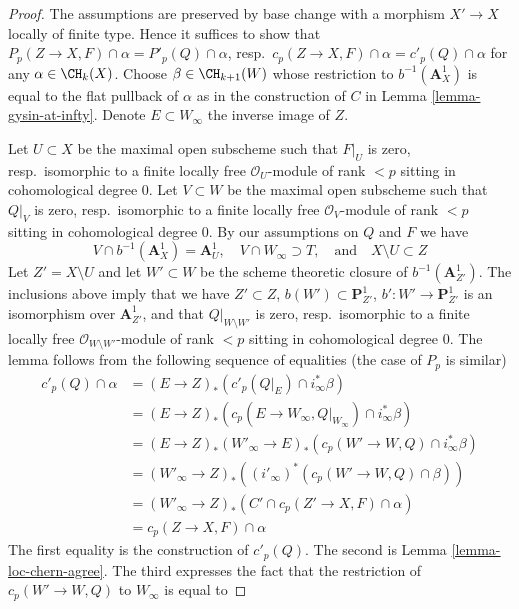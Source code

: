 \begin{proof}
The assumptions are preserved by base change with a morphism
$X' \to X$ locally of finite type. Hence it suffices to show that
$P_p(Z \to X, F) \cap \alpha = P'_p(Q) \cap \alpha$,
resp.\ $c_p(Z \to X, F) \cap \alpha = c'_p(Q) \cap \alpha$
for any $\alpha \in \CH_k(X)$. Choose $\beta \in \CH_{k + 1}(W)$
whose restriction to $b^{-1}(\mathbf{A}^1_X)$ is equal to
the flat pullback of $\alpha$ as in the construction of
$C$ in Lemma \ref{lemma-gysin-at-infty}.
Denote $E \subset W_\infty$ the inverse image of $Z$.

\medskip\noindent
Let $U \subset X$ be the maximal open subscheme such that $F|_U$ is
zero, resp.\ isomorphic to a finite locally free $\mathcal{O}_U$-module
of rank $< p$ sitting in cohomological degree $0$. Let $V \subset W$ be
the maximal open subscheme such that $Q|_V$ is zero, resp.\ isomorphic
to a finite locally free $\mathcal{O}_V$-module of rank $< p$ sitting in
cohomological degree $0$. By our assumptions on $Q$ and $F$ we have
$$
V \cap b^{-1}(\mathbf{A}^1_X) = \mathbf{A}^1_U,\quad
V \cap W_\infty \supset T,
\quad\text{and}\quad
X \setminus U \subset Z
$$
Let $Z' = X \setminus U$ and let $W' \subset W$ be the scheme
theoretic closure of $b^{-1}(\mathbf{A}^1_{Z'})$. The inclusions
above imply that we have $Z' \subset Z$, $b(W') \subset \mathbf{P}^1_{Z'}$,
$b' : W' \to \mathbf{P}^1_{Z'}$ is an isomorphism over $\mathbf{A}^1_{Z'}$,
and that $Q|_{W \setminus W'}$ is zero, resp.\ isomorphic to a finite
locally free $\mathcal{O}_{W \setminus W'}$-module of rank $< p$
sitting in cohomological degree $0$. The lemma follows from
the following sequence of equalities (the case of $P_p$ is similar)
\begin{align*}
c'_p(Q) \cap \alpha
& =
(E \to Z)_*(c'_p(Q|_E) \cap i_\infty^*\beta) \\
& =
(E \to Z)_*(c_p(E \to W_\infty, Q|_{W_\infty}) \cap i_\infty^*\beta) \\
& =
(E \to Z)_*(W'_\infty \to E)_*(c_p(W' \to W, Q) \cap i_\infty^*\beta) \\
& =
(W'_\infty \to Z)_*((i'_\infty)^*(c_p(W' \to W, Q) \cap \beta)) \\
& =
(W'_\infty \to Z)_*(C' \cap c_p(Z' \to X, F) \cap \alpha) \\
& =
c_p(Z \to X, F) \cap \alpha
\end{align*}
The first equality is the construction of $c'_p(Q)$. 
The second is Lemma \ref{lemma-loc-chern-agree}.
The third expresses the fact that the restriction of
$c_p(W' \to W, Q)$ to $W_\infty$ is equal to

\end{proof}
